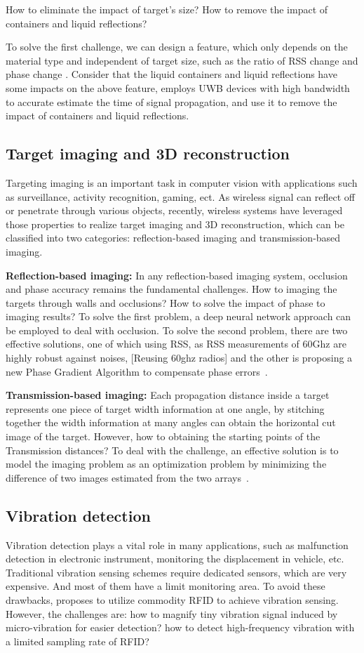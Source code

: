 How to eliminate the impact of target's size? How to remove the impact of containers and liquid reflections?

To solve the first challenge, we can design a feature, which only depends on the material type and independent of target size, such as the ratio of RSS change and phase change \cite{Tagscan}. Consider that the liquid containers and liquid reflections have some impacts on the above feature, \cite{LiquID} employs UWB devices with high bandwidth to accurate estimate the time of signal propagation, and use it to remove the impact of containers and liquid reflections.


\subsection{Target imaging and 3D reconstruction} Targeting imaging is an important task in computer vision with applications such as surveillance, activity recognition, gaming, ect. As wireless signal can reflect off or penetrate through various objects, recently, wireless systems have leveraged those properties to realize target imaging and 3D reconstruction, which can be classified into two categories: reflection-based imaging and transmission-based imaging.


\textbf{Reflection-based imaging:} In any reflection-based imaging system, occlusion and phase accuracy remains the fundamental challenges. How to imaging the targets through walls and occlusions? How to solve the impact of phase to imaging results?
To solve the first problem, a deep neural network approach can be employed to deal with occlusion. To solve the second problem, there are two effective solutions, one of which using RSS, as RSS measurements of 60Ghz are highly robust against noises, [Reusing 60ghz radios] and the other is proposing a new Phase Gradient Algorithm to compensate phase errors~\cite{mao2018aim}.

\textbf{Transmission-based imaging:} Each propagation distance inside a target represents one piece of target width information at one angle, by stitching together the width information at many angles can obtain the horizontal cut image of the target. However, how to obtaining the starting points of the Transmission distances?
To deal with the challenge, an effective solution is to model the imaging problem as an optimization problem by minimizing the difference of two images estimated from the two arrays~\cite{Tagscan}.


\subsection{Vibration detection} Vibration detection plays a vital role in many applications, such as malfunction detection in electronic instrument, monitoring the displacement in vehicle, etc. Traditional vibration sensing schemes require dedicated sensors, which are very expensive. And most of them have a limit monitoring area. To avoid these drawbacks, \cite{Tagbeat} proposes to utilize commodity RFID to achieve
vibration sensing. However, the challenges are: how to magnify tiny vibration signal induced by micro-vibration for easier detection? how to detect high-frequency vibration with a limited sampling rate of RFID?

